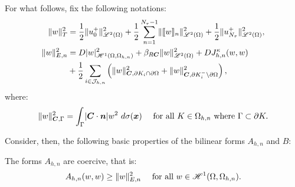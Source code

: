 For what follows, fix the following notations:
\begin{align} %
    \lVert w \rVert_{T}^2 &= \frac{1}{2} \lVert u_0^+ \rVert_{\SpaceLp{2}(\Omega)}^2 + \frac{1}{2} \sum_{n = 1}^{\nTimeIndices - 1} \lVert \Jump{w}_n \rVert_{\SpaceLp{2}(\Omega)}^2 + \frac{1}{2} \lVert u_{\nTimeIndices}^+ \rVert_{\SpaceLp{2}(\Omega)}^2, \\
    \lVert w \rVert_{E, n}^2 &= \Diffusion \lvert w \rvert_{\SpaceHk{1}(\Omega, \Omega_{h, n})}^2 + \BoundC{\Reaction \Convection} \lVert w \rVert_{\SpaceLp{2}(\Omega)}^2 + \Diffusion J^{\kappa}_{h, n}(w, w) \\
    &+ \frac{1}{2} \sum_{i \in \SpaceTimeIndices} \left( \lVert w \rVert_{\Convection, \partial K_i \cap \partial \Omega}^2 + \lVert w \rVert_{\Convection, \partial K_i^- \setminus \partial \Omega}^2 \right), \notag
\end{align}
where:
\begin{align}
    \lVert w \rVert_{\bm{C}, \Gamma}^2 &= \int_{\Gamma} \lvert \bm{C} \cdot \bm{n} \rvert w^2 ~ d \sigma(\bm{x}) &\text{ for all } K \in \Omega_{h, n} \text{ where } \Gamma \subset \partial K.
\end{align}

Consider, then, the following basic properties of the bilinear forms $A_{h, n}$ and $B$:

\begin{lemma}[Coercivity of $A_{h, n}$] \label{lemma:A_coercivity}
    The forms $A_{h, n}$ are coercive, that is:
    \begin{align}
        A_{h, n}(w, w) &\geq \lVert w \rVert_{E, n}^2 &\text{ for all } w \in \mathscr{H}^{1}(\Omega, \Omega_{h, n}).
    \end{align}
\end{lemma}

